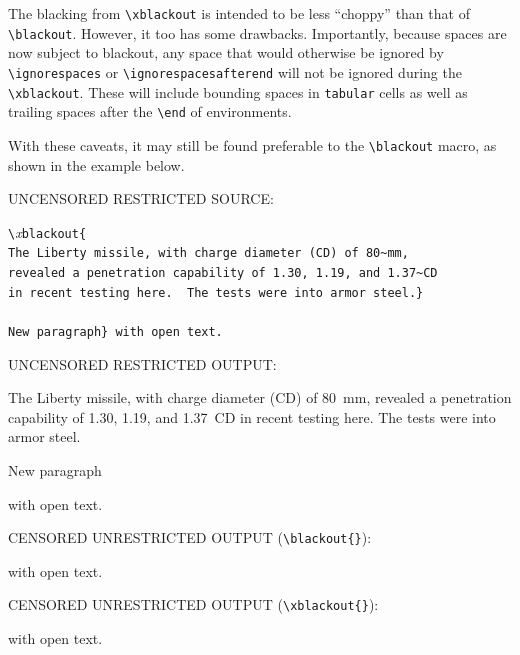\documentclass{article}
\begin{document}
The blacking from \verb|\xblackout| is intended to be less ``choppy''
than that of \verb|\blackout|.  However, it too has some drawbacks.
Importantly, because spaces are now subject to blackout, any
  space that would otherwise be ignored by \verb|\ignorespaces| or
  \verb|\ignorespacesafterend| will not be ignored during 
  the \verb|\xblackout|.
These will include bounding spaces in \verb|tabular| cells as well
as trailing spaces after the \verb|\end| of environments.

With these caveats,
it may still be found preferable to the \verb|\blackout| macro, as 
  shown in the example below.

{\addtolength{\leftskip}{2.3em}
UNCENSORED RESTRICTED SOURCE: \hrulefill


\verb|\|\textit{x}\verb|blackout{|\\
\verb|The Liberty missile, with charge diameter (CD) of 80~mm,|\\
\verb|revealed a penetration capability of 1.30, 1.19, and 1.37~CD|\\
\verb|in recent testing here.  The tests were into armor steel.}|\\
\verb| |\\
\verb|New paragraph} with open text.|

UNCENSORED RESTRICTED OUTPUT: \hrulefill

{
The Liberty missile, with charge diameter (CD) of 
80~mm, revealed a penetration capability of 1.30, 1.19, and 
1.37~CD in recent testing here.  The tests were into armor steel.

New paragraph} with open text.

CENSORED UNRESTRICTED OUTPUT (\verb|\blackout{}|): \hrulefill

 with open text.

CENSORED UNRESTRICTED OUTPUT (\verb|\xblackout{}|): \hrulefill

 with open text.

\hrulefill

}
\end{document}
